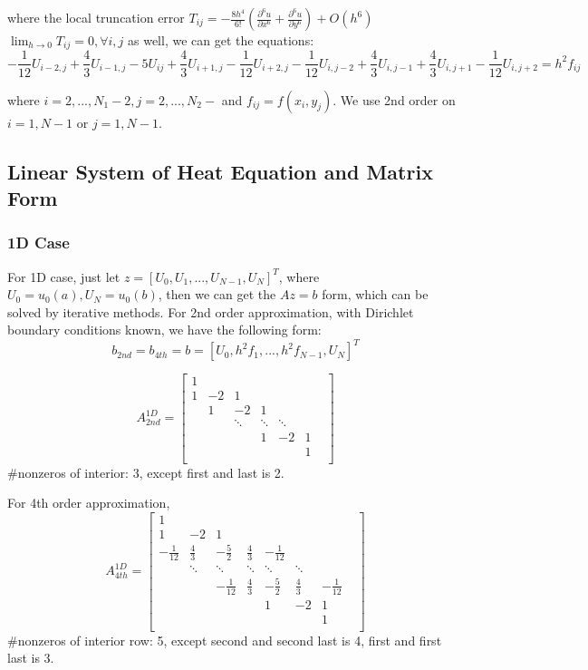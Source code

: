 \documentclass[a4paper]{article}
\begin{document}
where the local truncation error $T_{ij} = -\frac{8h^4}{6!}(\frac{\partial^6 u}{\partial x^6} + \frac{\partial^6 u}{\partial y^6}) + O(h^6) $ $\lim_{h\rightarrow 0} T_{ij} = 0, \forall i,j$ as well, we can get the equations:
\begin{equation}
     -\frac{1}{12}U_{i-2,j} + \frac{4}{3}U_{i-1,j} - 5U_{ij} + \frac{4}{3} U_{i+1,j} - \frac{1}{12}U_{i+2,j} -\frac{1}{12}U_{i,j-2} + \frac{4}{3} U_{i,j-1} + \frac{4}{3}U_{i,j+1} -\frac{1}{12}U_{i, j+2} = h^2 f_{ij}
\end{equation}

where $ i = 2,...,N_1-2, j = 2,...,N_2-$ and $f_{ij} = f(x_i,y_j)$. We use 2nd order on $i=1, N-1$ or $j=1, N-1$.

\subsection{Linear System of Heat Equation and Matrix Form}
\subsubsection{1D Case}
For 1D case, just let $z=[U_0, U_1,...,U_{N-1},U_N]^T$, where $U_0=u_0(a), U_N=u_0(b)$, then we can get the $Az = b$ form, which can be solved by iterative methods. For 2nd order approximation, with Dirichlet boundary conditions known, we have the following form:
$$b_{2nd} = b_{4th} = b = [ U_0, h^2f_1,...,h^2f_{N-1}, U_N ]^T$$

\[
A_{2nd}^{1D}
=
\begin{bmatrix}
    
    1  &  &   & & & \\
    1  & -2 & 1  &   &  &\\
       & 1  & -2 & 1  &  & \\
     & & \ddots & \ddots & \ddots & & \\
     & & & 1 & -2  & 1&\\
     & & &  &  & 1 \\
\end{bmatrix}
\]
\#nonzeros of interior: 3, except first and last is 2.  

For 4th order approximation, 
\[
A_{4th}^{1D}
=
\begin{bmatrix}
    
    1  &  &   & & & &\\
    1  & -2 & 1  &   &  & &\\
     -\frac{1}{12}  & \frac{4}{3}  & -\frac{5}{2} & \frac{4}{3}  & - \frac{1}{12} & &&\\
     & \ddots& \ddots & \ddots & \ddots & \ddots & \\
    && -\frac{1}{12}  & \frac{4}{3}  & -\frac{5}{2} & \frac{4}{3}  & - \frac{1}{12} \\
     & & & & 1 & -2  & 1\\
     & & & &   &     & 1 \\
\end{bmatrix}
\]
\#nonzeros of interior row: 5, except second and second last is 4, first and first last is 3.
\end{document}
